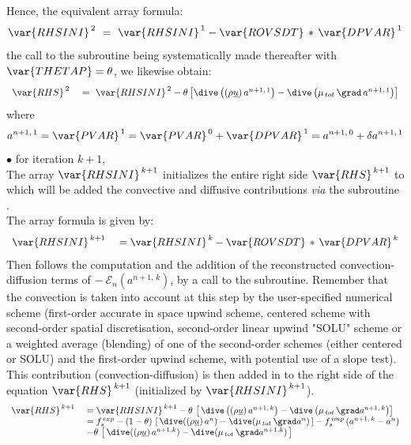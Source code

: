 \begin{itemize}
Hence, the equivalent array formula:
\begin{equation}\notag
\var{RHSINI}^{\,2}\ =\ \var{RHSINI}^{\,1} - \var{ROVSDT}\,*\,\var{DPVAR}^{\,1}
\end{equation}
the call to the subroutine  being systematically made thereafter with $\var{THETAP}=\theta$, we likewise obtain:
\begin{equation}\notag
\begin{array}{ll}
\var{RHS}^{\,2}\ &=\ \var{RHSINI}^{\,2}-\theta\left[\dive\left((\rho \underline{u})\,a^{n+1,\,1}\right)- \dive\left(\mu_{\,tot}\,\grad \,a^{n+1,\,1}\right)\right]\\
\end{array}
\end{equation}
where
\begin{equation}\notag
a^{n+1,\,1}=\var{PVAR}^{\,1}=\var{PVAR}^{\,0}+\var{DPVAR}^{\,1}=a^{n+1,\,0}+\delta a^{n+1,\,1}
\end{equation}
$\bullet$ for iteration $k+1$,\\
The array $\var{RHSINI}^{\,k+1}$ initializes the entire right side
$\var{RHS}^{\,k+1}$ to which will be added the convective and diffusive contributions
{\it via} the subroutine .\\
The array formula is given by:
\begin{equation}\notag
\begin{array}{ll}
\var{RHSINI}^{\,k+1}\ &= \var{RHSINI}^{\,k} - \var{ROVSDT}\,*\,\var{DPVAR}^{\,k}\\
\end{array}
\end{equation}
Then follows the computation and the addition of the reconstructed convection-diffusion terms of
$-\  \mathcal{E}_{n}(a^{n+1,\,k})$, by a call to the  subroutine. Remember
that the convection is taken into account at this step by the user-specified numerical scheme
(first-order accurate in space upwind scheme, centered scheme with second-order spatial discretisation, second-order
linear upwind "SOLU" scheme or a weighted average (blending) of one of the second-order schemes (either centered or SOLU) and the first-order upwind scheme, with potential use of a slope test).\\
This contribution (convection-diffusion) is then added in to the right side of the
equation  $\var{RHS}^{\,k+1}$ (initialized by $\var{RHSINI}^{\,k+1}$).
\begin{equation}\notag
\begin{array}{ll}
\var{RHS}^{\,k+1}\ &= \var{RHSINI}^{\,k+1} - \theta\,\left[\,\dive\left((\rho \underline{u})\,a^{n+1,\,k}\right)- \dive\left(\mu_{\,tot}\,\grad a^{n+1,\,k}\right)\right]\\
& = f_s^{\,exp}-(1-\theta)\,\left[\,\dive((\rho \underline{u})\,a^n) - \dive(\mu_{\,tot}\,\grad a^n)\,\right]- f_s^{\,imp}\,(a^{n+1,\,k} -a^{n}) \\
&-\theta\,\left[\,\dive((\rho \underline{u})\,a^{n+1,k}) - \dive(\mu_{\,tot}\,\grad a^{n+1,k})\,\right]\\
\end{array}
\end{equation}


\end{itemize}
